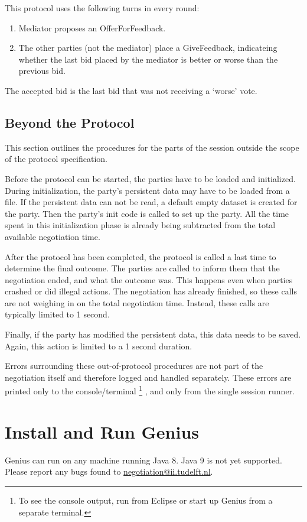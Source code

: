 \documentclass[]{article}
\newcommand\Genius{{\sc Genius}}
\begin{document}
This protocol uses the following turns in every round:
\begin{enumerate}
\item Mediator proposes an OfferForFeedback. 
\item The other parties (not the mediator) place a GiveFeedback,  indicateing whether the last bid placed by the mediator is better or worse than the previous bid.
\end{enumerate}

The accepted bid is the last bid that was not receiving a `worse' vote. 

\subsection{Beyond the Protocol}
This section outlines the procedures for the parts of the session outside the scope of the protocol specification.

Before the protocol can be started, the parties have to be loaded and initialized. During initialization, the party's persistent data may have to be loaded from a file. If the persistent data can not be read, a default empty dataset is created for the party. Then the party's init code is called to set up the party. All the time spent in this initialization phase is already being subtracted from the total available negotiation time.

After the protocol has been completed, the protocol is called a last time to determine the final outcome. 
The parties are called to inform them that the negotiation ended, and what the outcome was. This happens even when parties crashed or did illegal actions. The negotiation has already finished, so these calls are not weighing in on the total negotiation time. Instead, these calls are typically limited to 1 second. 

Finally, if the party has modified the persistent data, this data needs to be saved. Again, this action is limited to a 1 second duration.

Errors surrounding these out-of-protocol procedures are not part of the negotiation itself and therefore logged and handled separately. These errors are printed only to the console/terminal \footnote{To see the console output, run from Eclipse or start up Genius from a separate terminal. }
, and only from the single session runner.


\section{Install and Run {\Genius} }
{\Genius}  can run on any machine running Java 8. Java 9 is not yet supported. Please report any bugs found to \url{negotiation@ii.tudelft.nl}.
\end{document}
